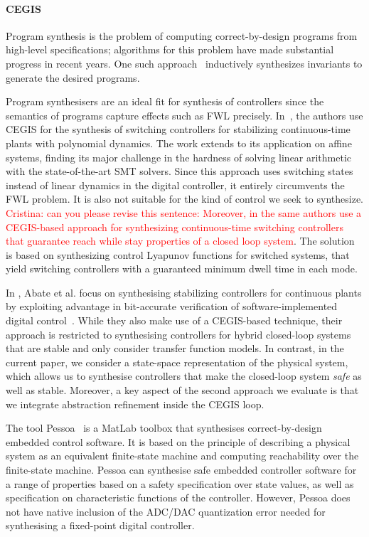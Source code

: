 \documentclass[runningheads,a4paper]{llncs}
\begin{document}
\paragraph{CEGIS}

Program synthesis is the problem of computing correct-by-design programs
from high-level specifications; algorithms for this problem have made
substantial progress in recent years.  One such
approach~\cite{itzhaky2010simple} inductively synthesizes invariants to
generate the desired programs.

Program synthesisers are an ideal fit for synthesis of %
controllers since the semantics of programs capture effects such as FWL
precisely.  In~\cite{DBLP:conf/cdc/RavanbakhshS15}, the authors use CEGIS
for the synthesis of switching controllers for stabilizing continuous-time
plants with polynomial dynamics.  The work extends to its application on
affine systems, finding its major challenge in the hardness of solving
linear arithmetic with the state-of-the-art SMT solvers.  Since this
approach uses switching states instead of linear dynamics in the digital
controller, it entirely circumvents the FWL problem.  It is also not
suitable for the kind of control we seek to synthesize.
\textcolor{red}{Cristina: can you please revise this sentence:
Moreover, in \cite{DBLP:conf/emsoft/RavanbakhshS16} the same authors 
use a CEGIS-based approach for synthesizing continuous-time switching
controllers that guarantee reach while stay properties of a closed
loop system}. The solution is based on synthesizing control Lyapunov
functions for switched systems, that yield switching controllers with
a guaranteed minimum dwell time in each mode.

In \cite{DBLP:journals/corr/AbateBCCDKK16}, Abate et al.  focus on
synthesising stabilizing controllers for continuous plants
by exploiting advantage in bit-accurate verification of software-implemented 
digital control~\cite{Bessa16}.  While they also make use of a CEGIS-based 
technique, their approach is restricted to synthesising controllers for hybrid 
closed-loop systems that are stable and only consider transfer function models.  
In contrast, in the current paper, we consider a state-space
representation of the physical system, which allows us to synthesise controllers that
make the closed-loop system \emph{safe} as well as stable.  Moreover, 
a key aspect of the second approach we evaluate
is that we integrate abstraction
refinement inside the CEGIS loop.

The tool Pessoa~\cite{mazo2010pessoa} is a MatLab toolbox that synthesises correct-by-design
embedded control software. It is based on the principle of describing a physical system
as an equivalent finite-state machine and computing reachability over the finite-state 
machine. Pessoa can synthesise safe embedded controller software for a range of properties based on a safety specification over state
values, as well as specification on characteristic functions of the controller. 
However, Pessoa does not have native inclusion of the ADC/DAC quantization error needed for
synthesising a fixed-point digital controller.
\end{document}
